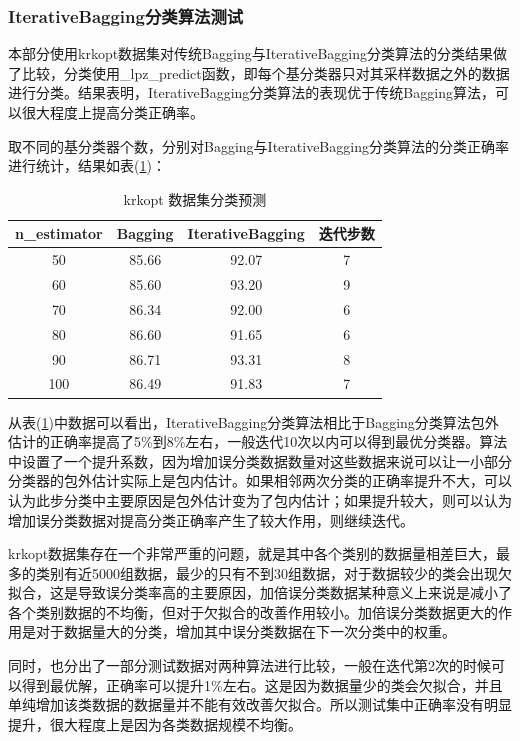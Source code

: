 \documentclass[a4paper,oneside,12pt]{article}
\begin{document}
\begin{spacing}{1.5}
\subsubsection{IterativeBagging分类算法测试}
本部分使用krkopt数据集对传统Bagging与IterativeBagging分类算法的分类结果做了比较，分类使用\_lpz\_predict函数，即每个基分类器只对其采样数据之外的数据进行分类。结果表明，IterativeBagging分类算法的表现优于传统Bagging算法，可以很大程度上提高分类正确率。\par
取不同的基分类器个数，分别对Bagging与IterativeBagging分类算法的分类正确率进行统计，结果如表(\ref{tab3})：\par
\begin{table}[htbp]
\caption{\label{tab3} krkopt 数据集分类预测}
\center
\begin{tabular}{cccc}
  \toprule
n\_estimator  &Bagging &IterativeBagging &迭代步数\\
 \midrule
50 &85.66 &92.07 &7\\

60 &85.60 &93.20 &9\\

70 &86.34 &92.00 &6\\

80 &86.60 &91.65 &6\\

90 &86.71 &93.31 &8\\

100 &86.49 &91.83 &7\\
\bottomrule
\end{tabular}
\end{table}


从表(\ref{tab3})中数据可以看出，IterativeBagging分类算法相比于Bagging分类算法包外估计的正确率提高了5\%到8\%左右，一般迭代10次以内可以得到最优分类器。算法中设置了一个提升系数，因为增加误分类数据数量对这些数据来说可以让一小部分分类器的包外估计实际上是包内估计。如果相邻两次分类的正确率提升不大，可以认为此步分类中主要原因是包外估计变为了包内估计；如果提升较大，则可以认为增加误分类数据对提高分类正确率产生了较大作用，则继续迭代。\par

krkopt数据集存在一个非常严重的问题，就是其中各个类别的数据量相差巨大，最多的类别有近5000组数据，最少的只有不到30组数据，对于数据较少的类会出现欠拟合，这是导致误分类率高的主要原因，加倍误分类数据某种意义上来说是减小了各个类别数据的不均衡，但对于欠拟合的改善作用较小。加倍误分类数据更大的作用是对于数据量大的分类，增加其中误分类数据在下一次分类中的权重。\par
同时，也分出了一部分测试数据对两种算法进行比较，一般在迭代第2次的时候可以得到最优解，正确率可以提升1\%左右。这是因为数据量少的类会欠拟合，并且单纯增加该类数据的数据量并不能有效改善欠拟合。所以测试集中正确率没有明显提升，很大程度上是因为各类数据规模不均衡。\par
\newpage

\end{spacing}
\end{document}
